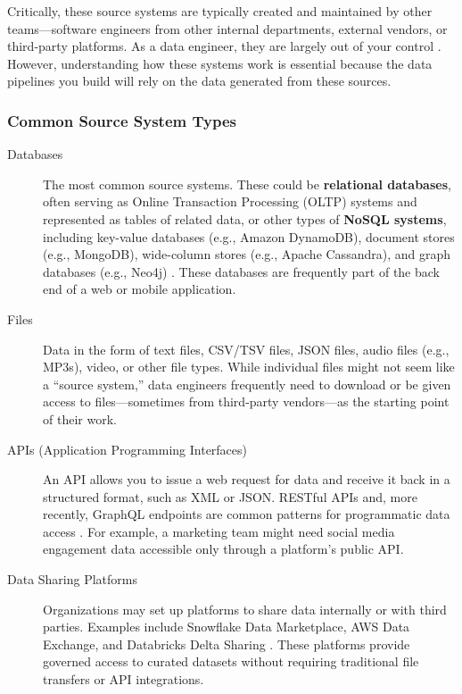 \documentclass{article}
\begin{document}
Critically, these source systems are typically created and maintained by other teams---software engineers from other internal departments, external vendors, or third-party platforms. As a data engineer, they are largely out of your control \cite{reis2022fundamentals}. However, understanding how these systems work is essential because the data pipelines you build will rely on the data generated from these sources.

\subsubsection{Common Source System Types}
\begin{description}
    \item[Databases] The most common source systems. These could be \textbf{relational databases}, often serving as Online Transaction Processing (OLTP) systems and represented as tables of related data, or other types of \textbf{NoSQL systems}, including key-value databases (e.g., Amazon DynamoDB), document stores (e.g., MongoDB), wide-column stores (e.g., Apache Cassandra), and graph databases (e.g., Neo4j) \cite{kleppmann2017designing}. These databases are frequently part of the back end of a web or mobile application.

    \item[Files] Data in the form of text files, CSV/TSV files, JSON files, audio files (e.g., MP3s), video, or other file types. While individual files might not seem like a ``source system,'' data engineers frequently need to download or be given access to files---sometimes from third-party vendors---as the starting point of their work.

    \item[APIs (Application Programming Interfaces)] An API allows you to issue a web request for data and receive it back in a structured format, such as XML or JSON. RESTful APIs and, more recently, GraphQL endpoints are common patterns for programmatic data access \cite{fielding2000rest}. For example, a marketing team might need social media engagement data accessible only through a platform's public API.

    \item[Data Sharing Platforms] Organizations may set up platforms to share data internally or with third parties. Examples include Snowflake Data Marketplace, AWS Data Exchange, and Databricks Delta Sharing \cite{armbrust2021lakehouse}. These platforms provide governed access to curated datasets without requiring traditional file transfers or API integrations.


\end{description}
\end{document}

